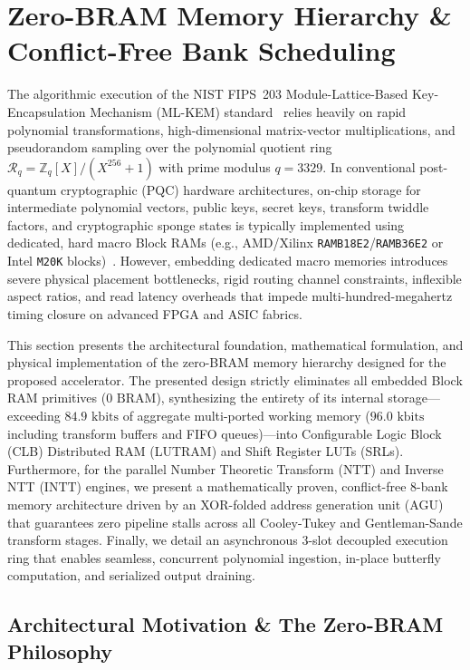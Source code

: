 \section{Zero-BRAM Memory Hierarchy \& Conflict-Free Bank Scheduling}
\label{sec:memory}

The algorithmic execution of the NIST FIPS~203 Module-Lattice-Based Key-Encapsulation Mechanism (\mbox{ML-KEM}) standard~\cite{fips203} relies heavily on rapid polynomial transformations, high-dimensional matrix-vector multiplications, and pseudorandom sampling over the polynomial quotient ring $\mathcal{R}_q = \mathbb{Z}_q[X]/(X^{256} + 1)$ with prime modulus $q = 3329$. In conventional post-quantum cryptographic (PQC) hardware architectures, on-chip storage for intermediate polynomial vectors, public keys, secret keys, transform twiddle factors, and cryptographic sponge states is typically implemented using dedicated, hard macro Block RAMs (e.g., AMD/Xilinx \texttt{RAMB18E2}/\texttt{RAMB36E2} or Intel \texttt{M20K} blocks)~\cite{banerjee2021sapphire, xing2023tcas1, imran2022tvlsi}. However, embedding dedicated macro memories introduces severe physical placement bottlenecks, rigid routing channel constraints, inflexible aspect ratios, and read latency overheads that impede multi-hundred-megahertz timing closure on advanced FPGA and ASIC fabrics.

This section presents the architectural foundation, mathematical formulation, and physical implementation of the zero-BRAM memory hierarchy designed for the proposed accelerator. The presented design strictly eliminates all embedded Block RAM primitives ($0\text{ BRAM}$), synthesizing the entirety of its internal storage---exceeding $84.9\text{ kbits}$ of aggregate multi-ported working memory ($96.0\text{ kbits}$ including transform buffers and FIFO queues)---into Configurable Logic Block (CLB) Distributed RAM (LUTRAM) and Shift Register LUTs (SRLs). Furthermore, for the parallel Number Theoretic Transform ($\text{NTT}$) and Inverse NTT ($\text{INTT}$) engines, we present a mathematically proven, conflict-free 8-bank memory architecture driven by an XOR-folded address generation unit (AGU) that guarantees zero pipeline stalls across all Cooley-Tukey and Gentleman-Sande transform stages. Finally, we detail an asynchronous 3-slot decoupled execution ring that enables seamless, concurrent polynomial ingestion, in-place butterfly computation, and serialized output draining.

\subsection{Architectural Motivation \& The Zero-BRAM Philosophy}
\label{sec:mem_motivation}

